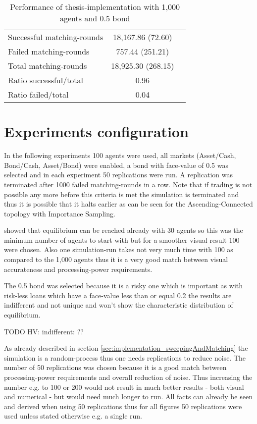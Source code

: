 \documentclass[Bachelorarbeit.tex]{subfiles}
\begin{document}
\begin{table}[H]
	\centering
	\caption{Performance of thesis-implementation with 1,000 agents and 0.5 bond}
	\begin{tabular} { l c r }
		\hline
		Successful matching-rounds & 18,167.86 (72.60) \\
		Failed matching-rounds & 757.44 (251.21) \\
		Total matching-rounds & 18,925.30 (268.15) \\
		\hline
		Ratio successful/total & 0.96 \\
		Ratio failed/total & 0.04 \\
		\hline
	\end{tabular}
\end{table}

\section{Experiments configuration}
In the following experiments 100 agents were used, all markets (Asset/Cash, Bond/Cash, Asset/Bond) were enabled, a bond with face-value of 0.5 was selected and in each experiment 50 replications were run. A replication was terminated after 1000 failed matching-rounds in a row. Note that if trading is not possible any more before this criteria is met the simulation is terminated and thus it is possible that it halts earlier as can be seen for the Ascending-Connected topology with Importance Sampling.

\bigskip 

\cite{Breuer2015} showed that equilibrium can be reached already with 30 agents so this was the minimum number of agents to start with but for a smoother visual result 100 were chosen. Also one simulation-run takes not very much time with 100 as compared to the 1,000 agents thus it is a very good match between visual accurateness and processing-power requirements.

\medskip

The 0.5 bond was selected because it is a risky one which is important as with risk-less loans which have a face-value less than or equal 0.2 the results are indifferent and not unique and won't show the characteristic distribution of equilibrium.

TODO HV: indifferent: ??

\medskip

As already described in section \ref{sec:implementation_sweepingAndMatching} the simulation is a random-process thus one needs replications to reduce noise. The number of 50 replications was chosen because it is a good match between processing-power requirements and overall reduction of noise. Thus increasing the number e.g. to 100 or 200 would not result in much better results - both visual and numerical - but would need much longer to run. All facts can already be seen and derived when using 50 replications thus for all figures 50 replications were used unless stated otherwise e.g. a single run.
\end{document}
